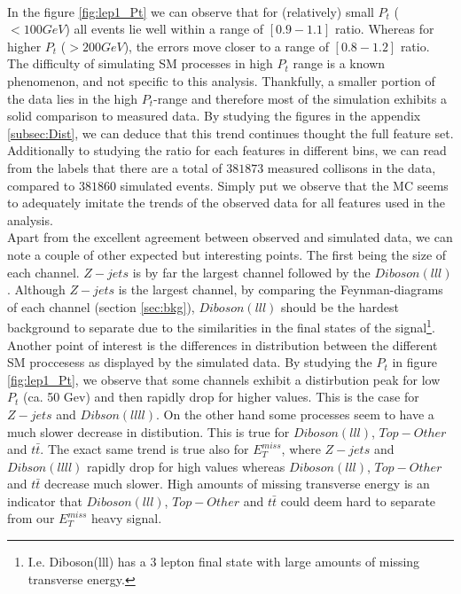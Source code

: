 \\
In the figure \ref{fig:lep1_Pt} we can observe that for (relatively) small $P_t$ ($<100GeV$) all events lie well within a range of $[0.9-1.1]$ ratio. 
Whereas for higher $P_t$ ($>200GeV$), the errors move closer to a range of $[0.8-1.2]$ ratio. The difficulty of simulating \ac{SM} processes 
in high $P_t$ range is a known phenomenon, and not specific to this analysis. Thankfully, a smaller portion of the data lies in the high $P_t$-range
and therefore most of the simulation exhibits a solid comparison to measured data. By studying the figures in the appendix \ref{subsec:Dist}, 
we can deduce that this trend continues thought the full feature set. Additionally to studying the ratio for each features in different bins,
we can read from the labels that there are a total of $381873$ measured collisons in the data, compared to $381860$ simulated events.
Simply put we observe that the \ac{MC} seems to adequately imitate the trends of the observed data for all features used in the analysis. 
\\
Apart from the excellent agreement between observed and simulated data, we can note a couple of other expected
but interesting points. The first being the size of each channel. $Z-jets$ is by far the largest channel followed
by the $Diboson (lll)$. Although $Z-jets$ is the largest channel, by comparing the Feynman-diagrams of each channel
(section \ref{sec:bkg}), $Diboson(lll)$ should be the hardest background to separate due to the similarities in the 
final states of the signal\footnote{I.e. Diboson(lll) has a 3 lepton final state with large amounts of missing transverse energy.}. Another 
point of interest is the differences in distribution between the different \ac{SM} proccesess as displayed by the 
simulated data. By studying the $P_t$ in figure \ref{fig:lep1_Pt}, we observe that some channels exhibit a distirbution  
peak for low $P_t$ (ca. 50 Gev) and then rapidly drop for higher values. This is the case for $Z-jets$ and $Dibson (llll)$.
On the other hand some processes seem to have a much slower decrease in distibution. This is true for $Diboson(lll)$, $Top-Other$
and $t\bar{t}$. The exact same trend is true also for $E_T^{miss}$, where $Z-jets$ and $Dibson (llll)$ rapidly drop for high values 
whereas $Diboson(lll)$, $Top-Other$ and $t\bar{t}$ decrease much slower. High amounts of missing transverse energy is an indicator that 
$Diboson(lll)$, $Top-Other$ and $t\bar{t}$ could deem hard to separate from our $E_T^{miss}$ heavy signal.
